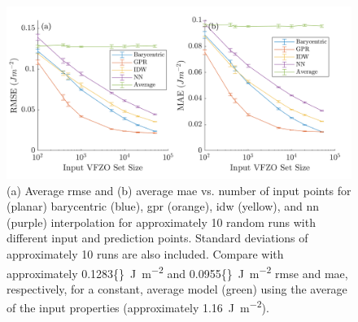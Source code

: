 \documentclass[final,twocolumn,12pt]{elsarticle}
\newcommand{\inpt}{input}
\newcommand{\outpt}{prediction}
\newcommand{\avgrmse}{0.1283}
\newcommand{\avgmae}{0.0955}
\begin{document}
\begin{figure}
    \centering
    \includegraphics[scale=1]{brkerror.png}
    \caption{(a) Average \gls{rmse} and (b) average \gls{mae} vs. number of \inpt{} points for (planar) barycentric (blue), \gls{gpr} (orange), \gls{idw} (yellow), and \gls{nn} (purple) interpolation for approximately 10 random runs with different \inpt{} and \outpt{} points. Standard deviations of approximately 10 runs are also included. Compare with approximately \SI{\avgrmse{}}{\J\per\square\meter} and \SI{\avgmae{}}{\J\per\square\meter} \gls{rmse} and \gls{mae}, respectively, for a constant, average model (green) using the average of the \inpt{} properties (approximately \SI{1.16}{\J\per\square\meter}).}
    \label{fig:brkerror}
\end{figure}
\end{document}
